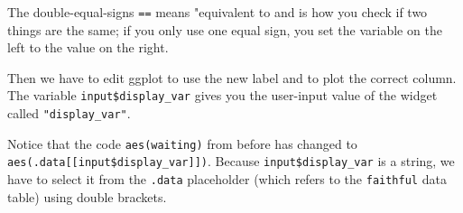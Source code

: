 \documentclass[
  oneside]{book}
\newenvironment{Shaded}{\begin{snugshade}}{\end{snugshade}}
\newcommand{\AttributeTok}[1]{\textcolor[rgb]{0.77,0.63,0.00}{#1}}
\newcommand{\CommentTok}[1]{\textcolor[rgb]{0.56,0.35,0.01}{\textit{#1}}}
\newcommand{\ControlFlowTok}[1]{\textcolor[rgb]{0.13,0.29,0.53}{\textbf{#1}}}
\newcommand{\FunctionTok}[1]{\textcolor[rgb]{0.00,0.00,0.00}{#1}}
\newcommand{\NormalTok}[1]{#1}
\newcommand{\OtherTok}[1]{\textcolor[rgb]{0.56,0.35,0.01}{#1}}
\newcommand{\SpecialCharTok}[1]{\textcolor[rgb]{0.00,0.00,0.00}{#1}}
\newcommand{\StringTok}[1]{\textcolor[rgb]{0.31,0.60,0.02}{#1}}
\begin{document}
\begin{Shaded}
\end{Shaded}

\begin{warning}
The double-equal-signs \texttt{==} means "equivalent to and is how you check if two things are the same; if you only use one equal sign, you set the variable on the left to the value on the right.

\end{warning}

Then we have to edit \AttributeTok{ggplot} to use the new label and to plot the correct column. The variable \texttt{input\$display\_var} gives you the user-input value of the widget called \texttt{"display\_var"}.

\begin{Shaded}
\end{Shaded}

\begin{warning}
Notice that the code \texttt{aes(waiting)} from before has changed to \texttt{aes(.data{[}{[}input\$display\_var{]}{]})}. Because \texttt{input\$display\_var} is a string, we have to select it from the \texttt{.data} placeholder (which refers to the \texttt{faithful} data table) using double brackets.

\end{warning}
\end{document}
